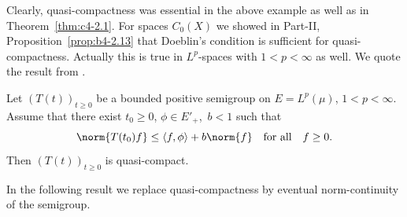 Clearly, quasi-compactness was essential in the above example as well as in Theorem~\ref{thm:c4-2.1}.
For spaces $C_{0}(X)$ we showed in 
Part-II, Proposition~\ref{prop:b4-2.13} 
that Doeblin's condition is sufficient for quasi-compactness.
Actually this is true in $L^{p}$-spaces with $1 < p < \infty$ as well.
We quote the result from \textcite{lotz:1986}.

\begin{proposition}\label{prop:c4-2.4}
%
%
Let $(T(t))_{t \geq 0}$ be a bounded positive semigroup on $E = L^{p}(\mu)$, $1 < p < \infty$.
Assume that there exist $t_{0} \geq 0$, $\phi \in E'_{+}$,\, $b < 1$ such that
\begin{equation}\label{eq:c4-2.4}
\norm{T(t_{0})f} \leq \langle f,\phi \rangle + b\norm{f} \quad \text{for all} \quad f \geq 0.
\end{equation}
Then $(T(t))_{t \geq 0}$ is quasi-compact.
\end{proposition}
In the following result we replace quasi-compactness by eventual norm-continuity of the semigroup.

